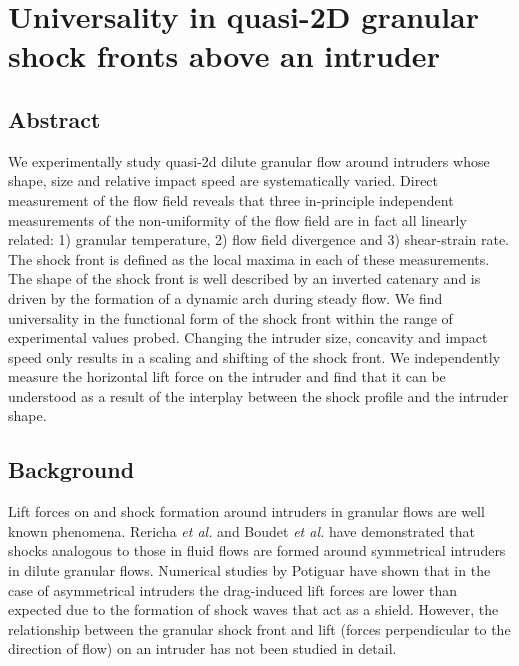 \chapter{Universality in quasi-2D granular shock fronts above an intruder}
\author{Mohammad Yasinul Karim, Eric I. Corwin}

%

\section{Abstract}

We experimentally study quasi-2d dilute granular flow around intruders whose shape, size and relative impact speed are systematically varied. Direct measurement of the flow field reveals that three in-principle independent measurements of the non-uniformity of the flow field are in fact all linearly related: 1) granular temperature, 2) flow field divergence and 3) shear-strain rate.  The shock front is defined as the local maxima in each of these measurements. The shape of the shock front is well described by an inverted catenary and is driven by the formation of a dynamic arch during steady flow. We find universality in the functional form of the shock front within the range of experimental values probed. Changing the intruder size, concavity and impact speed only results in a scaling and shifting of the shock front. We independently measure the horizontal lift force on the intruder and find that it can be understood as a result of the interplay between the shock profile and the intruder shape.

\section{Background}


Lift forces \cite{soller_drag_2006, ding_drag_2011,  potiguar_lift_2011, potiguar_lift_2013} on and shock formation \cite{haff_grain_1983, rericha_shocks_2001, amarouchene_speed_2006} around intruders in granular flows are well known phenomena. Rericha \textit{et al.} \cite{rericha_shocks_2001} and Boudet \textit{et al.}  \cite{boudet_shock_2008,  boudet_drag_2010} have demonstrated that shocks analogous to those in fluid flows are formed around symmetrical intruders in dilute granular flows. Numerical studies by Potiguar \cite{potiguar_lift_2011} have shown that in the case of asymmetrical intruders the drag-induced lift forces are lower than expected due to the formation of shock waves that act as a shield. However, the relationship between the granular shock front and lift (forces perpendicular to the direction of flow) on an intruder has not been studied in detail. 

